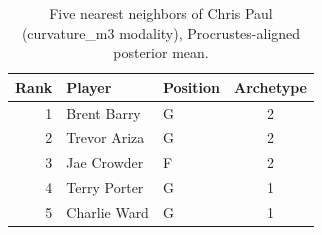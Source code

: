 \begin{table}[htbp]
  \centering\small
  \begin{tabular}{rllc}
    \toprule
    Rank & Player & Position & Archetype \\
    \midrule
    1 & Brent Barry & G & 2 \\
    2 & Trevor Ariza & G & 2 \\
    3 & Jae Crowder & F & 2 \\
    4 & Terry Porter & G & 1 \\
    5 & Charlie Ward & G & 1 \\
    \bottomrule
  \end{tabular}
  \caption{Five nearest neighbors of Chris Paul (curvature_m3 modality), Procrustes-aligned posterior mean.}
  \label{tab:Chris_Paul_neighbors_curvature_m3}
\end{table}

